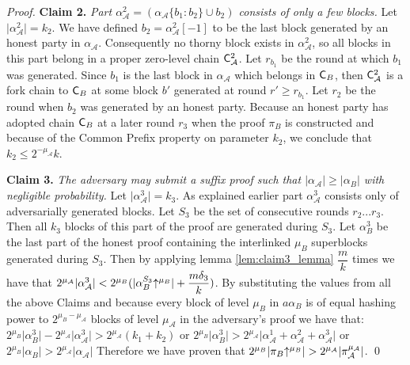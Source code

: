 \begin{proof}
\textbf{Claim 2.}
\textit{Part $\alpha_\mathcal{A}^2 = (\alpha_\mathcal{A}\{b_1:b_2\} \cup b_2)$ consists of only a few blocks.} Let $ \lvert \alpha_\mathcal{A}^2 \rvert = k_2$. We have defined $b_2 = \alpha_\mathcal{A}^2[-1]$ to be the last block generated by an honest party in $\alpha_\mathcal{A}$. Consequently no thorny block exists in $\alpha_\mathcal{A}^2$, so all blocks in this part belong in a proper zero-level chain $\mathsf{C}_\mathcal{A}^2$.  Let $r_{b_1}$ be the round at which $b_1$ was generated. Since $b_1$ is the last block in $\alpha_\mathcal{A}$ which belongs in $\mathsf{C}_B$, then $\mathsf{C}_\mathcal{A}^2$ is a fork chain to $\mathsf{C}_B$ at some block $b'$ generated at round $r' \geq r_{b_1}$. Let $r_2$ be the round when $b_2$ was generated by an honest party. Because an honest party has adopted chain $\mathsf{C}_B$ at a later round $r_3$ when the proof $\pi_B$ is constructed and because of the Common Prefix property on parameter $k_2$, we conclude that $k_2 \leq 2^{-\mu_\mathcal{A}}k$.

\textbf{Claim 3.} \textit{The adversary may submit a suffix proof such that $\lvert \alpha_\mathcal{A}\rvert \geq \lvert \alpha_B \rvert$ with negligible probability.} Let $ \lvert \alpha_\mathcal{A}^3 \rvert = k_3$. As explained earlier part $\alpha^3_\mathcal{A}$ consists only of adversarially generated blocks. Let $S_3$ be the set of consecutive rounds $r_2...r_3$. Then all $k_3$ blocks of this part of the proof are generated during $S_3$. Let $\alpha^{3}_B$ be the last part of the honest proof containing the interlinked $\mu_B$ superblocks generated during $S_3$. Then by applying lemma \ref{lem:claim3_lemma} $\dfrac{m}{k}$ times we have that $ 2^{\mu_\mathcal{A}}\lvert \alpha^3_\mathcal{A} \rvert < 2^{\mu_B} (\lvert \alpha^{S_3}_{B}\negthickspace\uparrow^{\mu_B} \rvert + \dfrac{m\delta_3}{k})$. By substituting the values from all the above Claims and because every block of level $\mu_B$ in $a\alpha_B$ is of equal hashing power to $2^{\mu_B - \mu_\mathcal{A}}$ blocks of level $\mu_\mathcal{A}$ in the adversary's proof we have that:
$2^{\mu_B} \lvert \alpha{_B^{3}} \rvert - 2^{\mu_\mathcal{A}} \lvert \alpha_\mathcal{A}^{3} \rvert > 2^{\mu_\mathcal{A}}(k_1 + k_2)$
or $2^{\mu_B} \lvert \alpha{_B^{3}} \rvert > 2^{\mu_\mathcal{A}} \lvert \alpha_\mathcal{A}^{1} + \alpha_\mathcal{A}^{2} + \alpha_\mathcal{A}^{3}\rvert $
or $2^{\mu_B} \lvert \alpha{_B} \rvert > 2^{\mu_\mathcal{A}} \lvert \alpha_\mathcal{A} \rvert $
Therefore we have proven that $2^{\mu_B} \lvert \pi_B \negthickspace\uparrow^{\mu_B} \rvert > 2^{\mu_\mathcal{A}} \lvert \pi_\mathcal{A}^{\mu_\mathcal{A}} \rvert$.
\qed
\end{proof}
